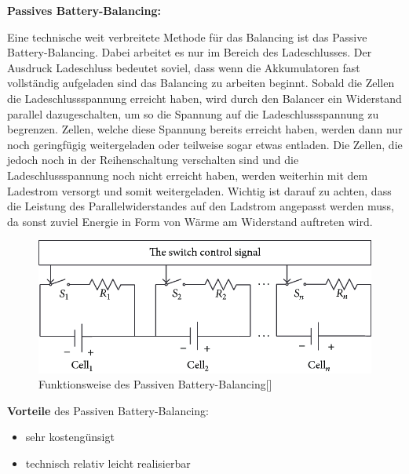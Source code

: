 \textbf{Passives Battery-Balancing:}

Eine technische weit verbreitete Methode für das Balancing ist das Passive Battery-Balancing. Dabei arbeitet es nur im Bereich des Ladeschlusses. Der Ausdruck Ladeschluss bedeutet soviel, dass wenn die Akkumulatoren fast vollständig aufgeladen sind das Balancing zu arbeiten beginnt. Sobald die Zellen die Ladeschlussspannung erreicht haben, wird durch den Balancer ein Widerstand parallel dazugeschalten, um so die Spannung auf die Ladeschlussspannung zu begrenzen. Zellen, welche diese Spannung bereits erreicht haben, werden dann nur noch geringfügig weitergeladen oder teilweise sogar etwas entladen. Die Zellen, die jedoch noch in der Reihenschaltung verschalten sind und die Ladeschlussspannung noch nicht erreicht haben, werden weiterhin mit dem Ladestrom versorgt und somit weitergeladen. Wichtig ist darauf zu achten, dass die Leistung des Parallelwiderstandes auf den Ladstrom angepasst werden muss, da sonst zuviel Energie in Form von Wärme am Widerstand auftreten wird.

\begin{figure}[H]
	\begin{center}
		\includegraphics[scale=0.5]{figures/Akku/Passive-cell-balancing.png}
		\caption{Funktionsweise des Passiven Battery-Balancing[\cite{FunktionsweisePassivBalancing}]}
		\label{fig: Funktionsweise des Passiven Battery-Balancing}
	\end{center}
\end{figure}

\textbf{Vorteile} des Passiven Battery-Balancing:
\begin{itemize}
\item {sehr kostengünsigt} \medskip\\
\item {technisch relativ leicht realisierbar} \medskip\\
\end{itemize}

